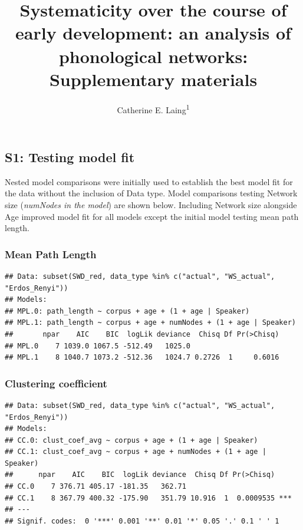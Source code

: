 \documentclass[
  man,floatsintext]{apa6}
\title{Systematicity over the course of early development: an analysis of phonological networks: Supplementary materials}
\author{Catherine E. Laing\textsuperscript{1}}
\date{}
\affiliation{\vspace{0.5cm}\textsuperscript{1} University of York, York, UK}
\begin{document}
\maketitle

\hypertarget{s1-testing-model-fit}{%
\subsection{S1: Testing model fit}\label{s1-testing-model-fit}}

Nested model comparisons were initially used to establish the best model fit for the data without the inclusion of Data type. Model comparisons testing Network size (\emph{numNodes in the model}) are shown below. Including Network size alongside Age improved model fit for all models except the initial model testing mean path length.

\hypertarget{mean-path-length}{%
\subsubsection{Mean Path Length}\label{mean-path-length}}

\begin{verbatim}
## Data: subset(SWD_red, data_type %in% c("actual", "WS_actual", "Erdos_Renyi"))
## Models:
## MPL.0: path_length ~ corpus + age + (1 + age | Speaker)
## MPL.1: path_length ~ corpus + age + numNodes + (1 + age | Speaker)
##       npar    AIC    BIC  logLik deviance  Chisq Df Pr(>Chisq)
## MPL.0    7 1039.0 1067.5 -512.49   1025.0                     
## MPL.1    8 1040.7 1073.2 -512.36   1024.7 0.2726  1     0.6016
\end{verbatim}

\hypertarget{clustering-coefficient}{%
\subsubsection{Clustering coefficient}\label{clustering-coefficient}}

\begin{verbatim}
## Data: subset(SWD_red, data_type %in% c("actual", "WS_actual", "Erdos_Renyi"))
## Models:
## CC.0: clust_coef_avg ~ corpus + age + (1 + age | Speaker)
## CC.1: clust_coef_avg ~ corpus + age + numNodes + (1 + age | Speaker)
##      npar    AIC    BIC  logLik deviance  Chisq Df Pr(>Chisq)    
## CC.0    7 376.71 405.17 -181.35   362.71                         
## CC.1    8 367.79 400.32 -175.90   351.79 10.916  1  0.0009535 ***
## ---
## Signif. codes:  0 '***' 0.001 '**' 0.01 '*' 0.05 '.' 0.1 ' ' 1
\end{verbatim}
\end{document}
